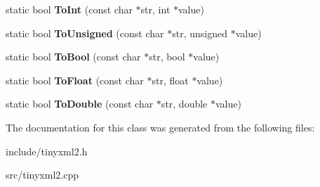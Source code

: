\begin{DoxyCompactItemize}
\item 
\hypertarget{classtinyxml2_1_1_x_m_l_util_ad4df4023d11ee3fca9689c49b9707323}{}static bool {\bfseries To\+Int} (const char $\ast$str, int $\ast$value)\label{classtinyxml2_1_1_x_m_l_util_ad4df4023d11ee3fca9689c49b9707323}

\item 
\hypertarget{classtinyxml2_1_1_x_m_l_util_a210c8637d5eb4ce3d4625294af0efc2f}{}static bool {\bfseries To\+Unsigned} (const char $\ast$str, unsigned $\ast$value)\label{classtinyxml2_1_1_x_m_l_util_a210c8637d5eb4ce3d4625294af0efc2f}

\item 
\hypertarget{classtinyxml2_1_1_x_m_l_util_ae5b03e0a1ca5d42052a7ac540f7aa12a}{}static bool {\bfseries To\+Bool} (const char $\ast$str, bool $\ast$value)\label{classtinyxml2_1_1_x_m_l_util_ae5b03e0a1ca5d42052a7ac540f7aa12a}

\item 
\hypertarget{classtinyxml2_1_1_x_m_l_util_a399e71edb5f29d61ea81d91ee0332bb9}{}static bool {\bfseries To\+Float} (const char $\ast$str, float $\ast$value)\label{classtinyxml2_1_1_x_m_l_util_a399e71edb5f29d61ea81d91ee0332bb9}

\item 
\hypertarget{classtinyxml2_1_1_x_m_l_util_ad8f75ac140fb19c1c6e164a957c4cd53}{}static bool {\bfseries To\+Double} (const char $\ast$str, double $\ast$value)\label{classtinyxml2_1_1_x_m_l_util_ad8f75ac140fb19c1c6e164a957c4cd53}

\end{DoxyCompactItemize}


The documentation for this class was generated from the following files\+:\begin{DoxyCompactItemize}
\item 
include/tinyxml2.\+h\item 
src/tinyxml2.\+cpp\end{DoxyCompactItemize}
